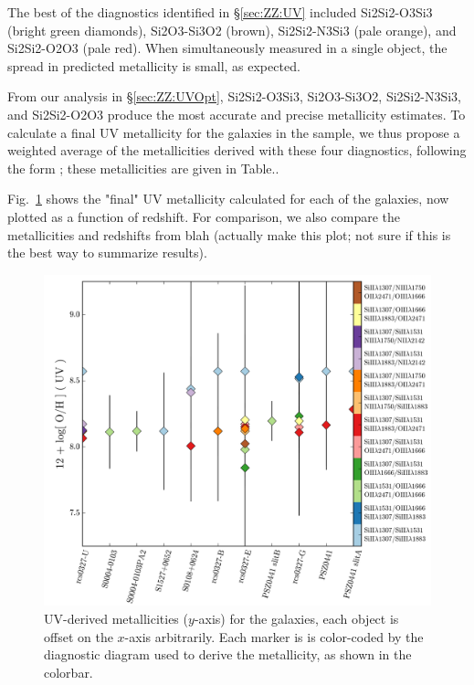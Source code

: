 The best of the diagnostics identified in \S\ref{sec:ZZ:UV} included Si2Si2-O3Si3 (bright green diamonds), Si2O3-Si3O2 (brown), Si2Si2-N3Si3 (pale orange), and Si2Si2-O2O3 (pale red). When simultaneously measured in a single object, the spread in predicted metallicity is small, as expected.

From our analysis in \S\ref{sec:ZZ:UVOpt}, Si2Si2-O3Si3, Si2O3-Si3O2, Si2Si2-N3Si3, and Si2Si2-O2O3 produce the most accurate and precise metallicity estimates. To calculate a final UV metallicity for the galaxies in the \mage sample, we thus propose a weighted average of the metallicities derived with these four diagnostics, following the form \XXX; these metallicities are given in Table.\XXX.

Fig.~\ref{fig:UVmage} shows the "final" UV metallicity calculated for each of the \mage galaxies, now plotted as a function of redshift. For comparison, we also compare the metallicities and redshifts from blah (\XXX actually make this plot; not sure if this is the best way to summarize results).

\begin{figure}
  \begin{center}
    \includegraphics[width=\linewidth]{figs/f8.png}
    \caption{UV-derived metallicities ($y$-axis) for the \mage galaxies, each object is offset on the $x$-axis arbitrarily. Each marker is is color-coded by the diagnostic diagram used to derive the metallicity, as shown in the colorbar. }
    \label{fig:UVmage}
  \end{center}
\end{figure}
